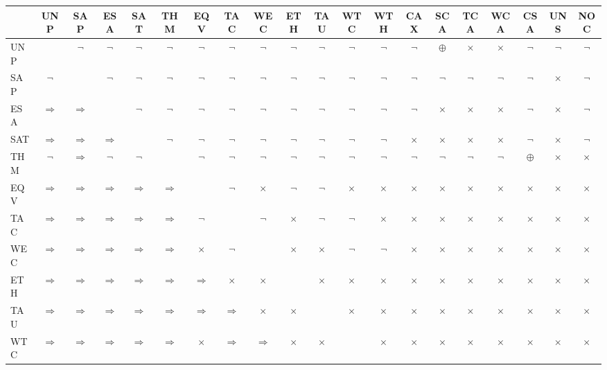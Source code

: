 \documentclass[a4paper]{easychair}
\newcommand{\isa}{$\Rightarrow$}
\newcommand{\nta}{$\neg$}
\newcommand{\nra}{$\times$}
\newcommand{\xor}{$\oplus$}
\newcommand{\equ}{\textbullet}
\begin{document}
\setlength{\tabcolsep}{2pt}
\begin{table}[bt]
\begin{center}
\begin{tabular}{l|ccccccccccccccccccc}
                    & {\footnotesize UNP} & {\footnotesize SAP} & {\footnotesize ESA} & {\footnotesize SAT} & {\footnotesize THM} & {\footnotesize EQV} & {\footnotesize TAC} & {\footnotesize WEC} & {\footnotesize ETH} & {\footnotesize TAU} & {\footnotesize WTC} & {\footnotesize WTH} & {\footnotesize CAX} & {\footnotesize SCA} & {\footnotesize TCA} & {\footnotesize WCA} & {\footnotesize CSA} & {\footnotesize UNS} & {\footnotesize NOC} \\
\hline
{\footnotesize UNP} &\equ &\nta &\nta &\nta &\nta &\nta &\nta &\nta &\nta &\nta &\nta &\nta &\nta &\xor &\nra &\nra &\nta &\nta &\nta \\
{\footnotesize SAP} &\nta &\equ &\nta &\nta &\nta &\nta &\nta &\nta &\nta &\nta &\nta &\nta &\nta &\nta &\nta &\nta &\nta &\nra &\nta \\
{\footnotesize ESA} &\isa &\isa &\equ &\nta &\nta &\nta &\nta &\nta &\nta &\nta &\nta &\nta &\nta &\nra &\nra &\nra &\nta &\nra &\nta \\
{\footnotesize SAT} &\isa &\isa &\isa &\equ &\nta &\nta &\nta &\nta &\nta &\nta &\nta &\nta &\nra &\nra &\nra &\nra &\nta &\nra &\nta \\
{\footnotesize THM} &\nta &\isa &\nta &\nta &\equ &\nta &\nta &\nta &\nta &\nta &\nta &\nta &\nta &\nta &\nta &\nta &\xor &\nra &\nra \\
{\footnotesize EQV} &\isa &\isa &\isa &\isa &\isa &\equ &\nta &\nra &\nta &\nta &\nra &\nra &\nra &\nra &\nra &\nra &\nra &\nra &\nra \\
{\footnotesize TAC} &\isa &\isa &\isa &\isa &\isa &\nta &\equ &\nta &\nra &\nta &\nta &\nra &\nra &\nra &\nra &\nra &\nra &\nra &\nra \\
{\footnotesize WEC} &\isa &\isa &\isa &\isa &\isa &\nra &\nta &\equ &\nra &\nra &\nta &\nta &\nra &\nra &\nra &\nra &\nra &\nra &\nra \\
{\footnotesize ETH} &\isa &\isa &\isa &\isa &\isa &\isa &\nra &\nra &\equ &\nra &\nra &\nra &\nra &\nra &\nra &\nra &\nra &\nra &\nra \\
{\footnotesize TAU} &\isa &\isa &\isa &\isa &\isa &\isa &\isa &\nra &\nra &\equ &\nra &\nra &\nra &\nra &\nra &\nra &\nra &\nra &\nra \\
{\footnotesize WTC} &\isa &\isa &\isa &\isa &\isa &\nra &\isa &\isa &\nra &\nra &\equ &\nra &\nra &\nra &\nra &\nra &\nra &\nra &\nra \\

\end{tabular}
\end{center}
\end{table}
\end{document}
